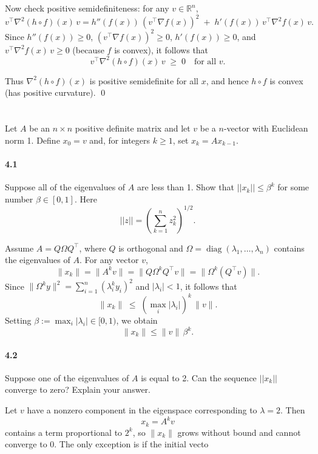 \documentclass[a4paper]{article}
\begin{document}
Now check positive semidefiniteness: for any $v \in \mathbb{R}^n$,
\[
v^\top \nabla^2 (h\circ f)(x)\, v
= h''(f(x))\, (v^\top \nabla f(x))^2 \;+\; h'(f(x))\, v^\top \nabla^2 f(x)\, v.
\]
Since $h''(f(x)) \ge 0$, $(v^\top \nabla f(x))^2 \ge 0$, $h'(f(x)) \ge 0$, and $v^\top \nabla^2 f(x)\, v \ge 0$ (because $f$ is convex), it follows that
\[
v^\top \nabla^2 (h\circ f)(x)\, v \;\ge\; 0 \quad \text{for all } v.
\]

Thus $\nabla^2 (h\circ f)(x)$ is positive semidefinite for all $x$, and hence $h\circ f$ is convex (has positive curvature).
\qed

\section{}
Let $A$ be an $n \times n$ positive definite matrix and let $v$ be a $n$-vector with Euclidean norm 1.
Define $x_0 = v$ and, for integers $k \geq 1$, set $x_k = Ax_{k-1}.$
\paragraph{4.1}
Suppose all of the eigenvalues of $A$ are less than 1.
Show that $||x_k || \leq \beta^k$ for some number $\beta \in [0, 1]$.
Here
$$||z|| = \left( \sum_{k=1}^n z_k^2 \right)^{1/2}.$$

Assume $A = Q \Omega Q^\top$, where $Q$ is orthogonal and $\Omega = \operatorname{diag}(\lambda_1,\dots,\lambda_n)$ contains the eigenvalues of $A$.
For any vector $v$,
\[
\|x_k\| = \|A^k v\| = \|Q \Omega^k Q^\top v\| = \|\Omega^k (Q^\top v)\|.
\]
Since $\|\Omega^k y\|^2 = \sum_{i=1}^n (\lambda_i^k y_i)^2$ and $|\lambda_i| < 1$, it follows that
\[
\|x_k\| \;\le\; (\max_i |\lambda_i|)^k \,\|v\|.
\]
Setting $\beta := \max_i |\lambda_i| \in [0,1)$, we obtain
\[
\|x_k\| \le \|v\|\, \beta^k.
\]

\paragraph{4.2}
Suppose one of the eigenvalues of $A$ is equal to 2.
Can the sequence $||x_k||$ converge to zero?
Explain your answer.

Let $v$ have a nonzero component in the eigenspace corresponding to $\lambda=2$. Then
\[
x_k = A^k v
\]
contains a term proportional to $2^k$, so $\|x_k\|$ grows without bound and cannot converge to $0$.
The only exception is if the initial vecto
\end{document}
